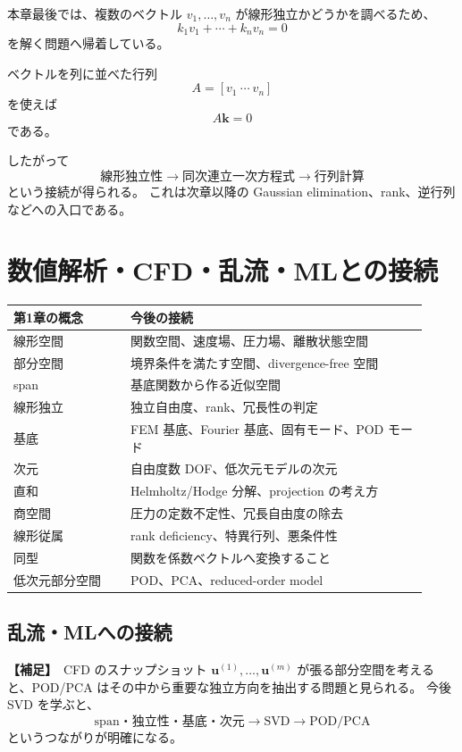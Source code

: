\documentclass[a4paper,11pt]{ltjsarticle}
\newcommand{\suppitem}{\textbf{【補足】}}
\begin{document}
本章最後では、複数のベクトル $v_1,\dots,v_n$ が線形独立かどうかを調べるため、
\[
k_1v_1+\cdots+k_nv_n=0
\]
を解く問題へ帰着している。

ベクトルを列に並べた行列
\[
A=[v_1\ \cdots\ v_n]
\]
を使えば
\[
A\bm{k}=0
\]
である。

したがって
\[
\boxed{
\text{線形独立性}
\longrightarrow
\text{同次連立一次方程式}
\longrightarrow
\text{行列計算}
}
\]
という接続が得られる。
これは次章以降の Gaussian elimination、rank、逆行列などへの入口である。

\section{数値解析・CFD・乱流・MLとの接続}

\begin{longtable}{>{\raggedright\arraybackslash}p{0.26\linewidth}p{0.66\linewidth}}
\toprule
\textbf{第1章の概念} & \textbf{今後の接続}\\
\midrule
線形空間 & 関数空間、速度場、圧力場、離散状態空間\\
部分空間 & 境界条件を満たす空間、divergence-free 空間\\
span & 基底関数から作る近似空間\\
線形独立 & 独立自由度、rank、冗長性の判定\\
基底 & FEM 基底、Fourier 基底、固有モード、POD モード\\
次元 & 自由度数 DOF、低次元モデルの次元\\
直和 & Helmholtz/Hodge 分解、projection の考え方\\
商空間 & 圧力の定数不定性、冗長自由度の除去\\
線形従属 & rank deficiency、特異行列、悪条件性\\
同型 & 関数を係数ベクトルへ変換すること\\
低次元部分空間 & POD、PCA、reduced-order model\\
\bottomrule
\end{longtable}

\subsection{乱流・MLへの接続}
\suppitem\ CFD のスナップショット $\bm{u}^{(1)},\dots,\bm{u}^{(m)}$ が張る部分空間を考えると、POD/PCA はその中から重要な独立方向を抽出する問題と見られる。
今後 SVD を学ぶと、
\[
\boxed{
\text{span・独立性・基底・次元}
\longrightarrow
\text{SVD}
\longrightarrow
\text{POD/PCA}
}
\]
というつながりが明確になる。
\end{document}
